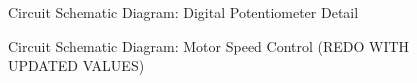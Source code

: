 \documentclass[a4]{report}
\begin{document}
	\begin{figure}[!htb]
		\centering
		\caption{Circuit Schematic Diagram: Digital Potentiometer Detail}
		\label{circdigpotclose}
	\end{figure} \newline  \noindent
	\begin{figure}[!htb]
		\centering
		\caption{Circuit Schematic Diagram: Motor Speed Control (REDO WITH UPDATED VALUES)}
		\label{circspeedcontr}
	\end{figure} \newline  \noindent
\end{document}

